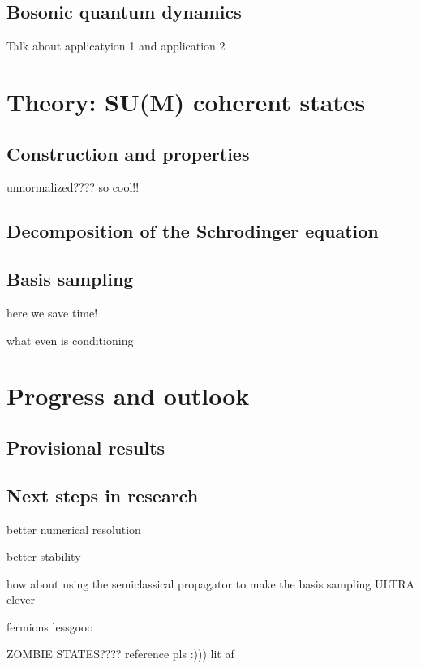 \documentclass[12pt]{article}
\begin{document}
	\subsection{Bosonic quantum dynamics}
	Talk about applicatyion 1 and application 2
	
	
	
	\section{Theory: SU(M) coherent states}
	
	\subsection{Construction and properties}
	
	unnormalized???? so cool!!
	
	\subsection{Decomposition of the Schrodinger equation}
	
	\subsection{Basis sampling}
	
	here we save time!
	
	what even is conditioning
	
	
	
	\section{Progress and outlook}
	
	\subsection{Provisional results}
	
	\subsection{Next steps in research}
	better numerical resolution
	
	better stability
	
	how about using the semiclassical propagator to make the basis sampling ULTRA clever
	
	fermions lessgooo
	
	ZOMBIE STATES???? reference pls :))) lit af
	
\end{document}
